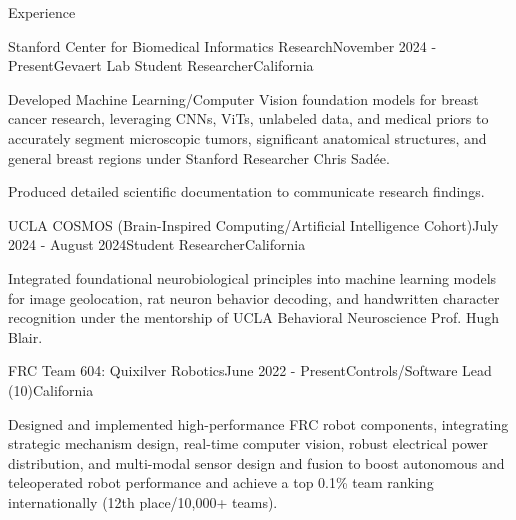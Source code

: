 \documentclass[
  10pt, %
]{resume}
\begin{document}
\sloppy


\begin{rSection}{Experience}


  \begin{rSubsection}{Stanford Center for Biomedical Informatics Research}{November 2024 - Present}{Gevaert Lab Student Researcher}{California}
    
    \item Developed Machine Learning/Computer Vision foundation models for breast cancer research, leveraging CNNs, ViTs, unlabeled data, and medical priors to accurately segment microscopic tumors, significant anatomical structures, and general breast regions under Stanford Researcher Chris Sadée.
    
    \item Produced detailed scientific documentation to communicate research findings.
    
  \end{rSubsection}
        
  \begin{rSubsection}{UCLA COSMOS (Brain-Inspired Computing/Artificial Intelligence Cohort)}{July 2024 - August 2024}{Student Researcher}{California}
    
    \item Integrated foundational neurobiological principles into machine learning models for image geolocation, rat neuron behavior decoding, and handwritten character recognition under the mentorship of UCLA Behavioral Neuroscience Prof. Hugh Blair.
    
  \end{rSubsection}
        
  \begin{rSubsection}{FRC Team 604: Quixilver Robotics}{June 2022 - Present}{Controls/Software Lead (10)}{California}
    
    \item Designed and implemented high-performance FRC robot components, integrating strategic mechanism design, real-time computer vision, robust electrical power distribution, and multi-modal sensor design and fusion to boost autonomous and teleoperated robot performance and achieve a top 0.1\% team ranking internationally (12th place/10,000+ teams).
    

\end{rSubsection}
\end{rSection}
\end{document}
